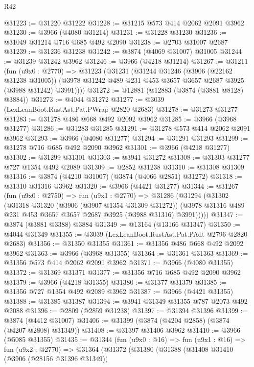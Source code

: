 \begin{lexlean}{R42}
\begin{coremodule}
@31223 := @31220 @31222
@31228 := @31215 @573 @414 @2062 @2091 @3962
@31230 := @3966 (@4080 @31214)
@31231 := @31228 @31230
@31236 := @31049 @31214 @716 @685 @492 @2090
@31238 := @2703 @31007 @2687
@31239 := @31236 @31238
@31242 := @3874 (@4069 @31007) @31005
@31244 := @31239 @31242 @3962
@31246 := @3966 (@4218 @31214)
@31267 := @31211
    (fun (u9x0 : @2770) =>
    @31223
      (@31231
        (@31244
          @31246
          (@3906 (@22162 @31238 @31005))
          (@3978 @31242 @489 @231 @453 @3657 @3657 @2687 @3925 (@3988 @31242) @3991))))
@31272 := @12881 (@12883 (@3874 (@3881 @8128) @3884))
@31273 := @4044 @31272
@31277 := @3039 (LexLeanBoot.RustAst.Pat.PWrap @2820 @2683)
@31278 := @31273 @31277
@31283 := @31278 @486 @668 @492 @2092 @3962
@31285 := @3966 (@3968 @31277)
@31286 := @31283 @31285
@31291 := @31278 @573 @414 @2062 @2091 @3962
@31293 := @3966 (@4080 @31277)
@31294 := @31291 @31293
@31299 := @31278 @716 @685 @492 @2090 @3962
@31301 := @3966 (@4218 @31277)
@31302 := @31299 @31301
@31303 := @3941 @31272
@31308 := @31303 @31277 @727 @1354 @492 @2089
@31309 := @2852 @31238
@31310 := @31308 @31309
@31316 := @3874 (@4210 @31007) (@3874 (@4066 @2851) @31272)
@31318 := @31310 @31316 @3962
@31320 := @3966 (@4421 @31277)
@31344 := @31267
    (fun (u9x0 : @2750) =>
    fun (u9x1 : @2770) =>
    @31286
      (@31294
        (@31302
          (@31318
            @31320
            (@3906 (@3907 @1354 @31309 @31272))
            (@3978 @31316 @489 @231 @453 @3657 @3657 @2687 @3925 (@3988 @31316) @3991)))))
@31347 := @3874 (@3881 @3388) @3884
@31349 := @13164 (@13166 @31347)
@31350 := @4044 @31349
@31355 := @3039 (LexLeanBoot.RustAst.Pat.PAdt @2796 @2820 @2683)
@31356 := @31350 @31355
@31361 := @31356 @486 @668 @492 @2092 @3962
@31363 := @3966 (@3968 @31355)
@31364 := @31361 @31363
@31369 := @31356 @573 @414 @2062 @2091 @3962
@31371 := @3966 (@4080 @31355)
@31372 := @31369 @31371
@31377 := @31356 @716 @685 @492 @2090 @3962
@31379 := @3966 (@4218 @31355)
@31380 := @31377 @31379
@31385 := @31356 @727 @1354 @492 @2089 @3962
@31387 := @3966 (@4421 @31355)
@31388 := @31385 @31387
@31394 := @3941 @31349 @31355 @787 @2073 @492 @2088
@31396 := @2809 (@2859 @31238)
@31397 := @31394 @31396
@31399 := @3874 (@4412 @31007)
@31406 := @31399 (@3874 (@4204 @2858) (@3874 (@4207 @2808) @31349))
@31408 := @31397 @31406 @3962
@31410 := @3966 (@5085 @31355)
@31435 := @31344
    (fun (u9x0 : @16) =>
    fun (u9x1 : @16) =>
    fun (u9x2 : @2770) =>
    @31364
      (@31372
        (@31380
          (@31388
            (@31408
              @31410
              (@3906 (@28156 @31396 @31349))

\end{coremodule}
\end{lexlean}
